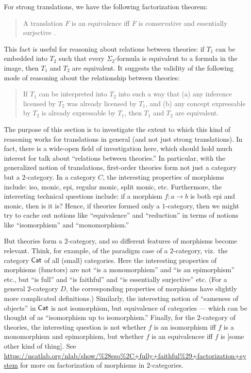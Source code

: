 \documentclass[12pt]{article}
\theoremstyle{definition}
\theoremstyle{remark}
\newcommand{\3}{\mathcal}
\begin{document}
For strong translations, we have the following factorization theorem:
\begin{quote} A translation $F$ is an equivalence iff $F$ is
  conservative and essentially surjective \citep[Props.\ 4.5.26,
  4.5.27]{tlps}. \end{quote} This fact is useful for reasoning about
relations between theories: if $T_1$ can be embedded into $T_2$ such
that every $\Sigma _2$-formula is equivalent to a formula in the
image, then $T_1$ and $T_2$ are equivalent. It suggests the validity
of the following mode of reasoning about the relationship between
theories:
\begin{quote}
  If $T_1$ can be interpreted into $T_2$ into such a way that (a) any
  inference licensed by $T_2$ was already licensed by $T_1$, and (b)
  any concept expressable by $T_2$ is already expressable by $T_1$,
  then $T_1$ and $T_2$ are equivalent. \end{quote} The purpose of this
section is to investigate the extent to which this kind of reasoning
works for translations in general (and not just strong
translations). In fact, there is a wide-open field of investigation
here, which should hold much interest for talk about ``relations
between theories.'' In particular, with the generalized notion of
translations, first-order theories form not just a category but a
$2$-category. In a category $C$, the interesting properties of
morphisms include: iso, monic, epi, regular monic, split monic,
etc. Furthermore, the interesting technical questions include: if a
morphism $f:a\to b$ is both epi and monic, then is it is?  Hence, if
theories formed only a $1$-category, then we might try to cache out
notions like ``equivalence'' and ``reduction'' in terms of notions
like ``isomorphism'' and ``monomorphism.''

But theories form a $2$-category, and so different features of
morphisms become relevant. Think, for example, of the paradigm case of
a $2$-category, viz.\ the category $\mathsf{Cat}$ of all (small)
categories. Here the interesting properties of morphisms (functors)
are not ``is a monomorphism'' and ``is an epimorphism'' etc., but ``is
full'' and ``is faithful'' and ``is essentially surjective'' etc. (For
a general $2$-category $D$, the corresponding properties of morphisms
have slightly more complicated definitions.)  Similarly, the
interesting notion of ``sameness of objects'' in $\mathsf{Cat}$ is not
isomorphism, but equivalence of categories --- which can be thought of
as ``isomorphism up to isomorphism.'' Finally, for the $2$-category of
theories, the interesting question is not whether $f$ is an
isomorphism iff $f$ is a monomorphism and epimorphism, but whether $f$
is an equivalencee iff $f$ is [some other kind of thing]. See
\url{https://ncatlab.org/nlab/show/%28eso%2C+fully+faithful%29+factorization+system}
  for more on factorization of morphisms in $2$-categories.                                
\end{document}
